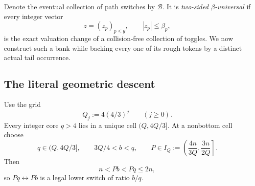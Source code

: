 \documentclass[11pt]{article}
\numberwithin{equation}{section}
\theoremstyle{definition}
\theoremstyle{remark}
\newcommand{\1}{\mathbf 1}
\begin{document}
Denote the eventual collection of path switches by \(\mathcal B\).  It is
\emph{two-sided \(\beta\)-universal} if every integer vector
\begin{equation}
 z=(z_p)_{p\le y},\qquad |z_p|\le\beta_p,
 \label{eq:universal-box-vector}
\end{equation}
is the exact valuation change of a collision-free collection of toggles.
We now construct such a bank while backing every one of its rough tokens by
a distinct actual tail occurrence.

\subsection{The literal geometric descent}
\label{subsec:bank-ordinary-descent}

Use the grid
\begin{equation}
                         Q_j:=4(4/3)^j\qquad(j\ge0).
 \label{eq:bank-literal-grid}
\end{equation}
Every integer core \(q>4\) lies in a unique cell \((Q,4Q/3]\).  At a
nonbottom cell choose
\begin{equation}
 q\in(Q,4Q/3],\qquad 3Q/4<b<q,\qquad
 P\in I_Q:=\left(\frac{4n}{3Q},\frac{3n}{2Q}\right].
 \label{eq:bank-ordinary-cell}
\end{equation}
Then
\begin{equation}
                         n<Pb<Pq\le2n,
 \label{eq:bank-ordinary-endpoints}
\end{equation}
so \(Pq\leftrightarrow Pb\) is a legal lower switch of ratio \(b/q\).
\end{document}
